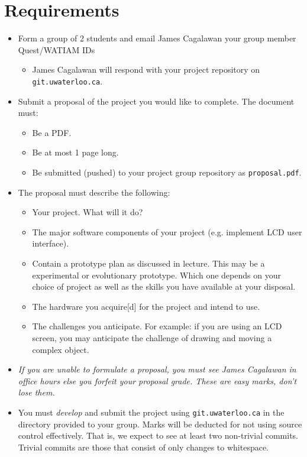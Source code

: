 \documentclass{article}
\begin{document}
\section*{Requirements}
\begin{itemize}
    \item{Form a group of 2 students and email James Cagalawan your group member Quest/WATIAM IDs}
        \begin{itemize}
            \item James Cagalawan will respond with your project repository on \texttt{git.uwaterloo.ca}.
        \end{itemize}\pagebreak[2]
    \item{Submit a proposal of the project you would like to complete.  The document must:}
        \begin{itemize}
            \item Be a PDF.
            \item Be at most 1 page long.
            \item Be submitted (pushed) to your project group repository as \texttt{proposal.pdf}.
        \end{itemize}\pagebreak[2]
    \item{The proposal must describe the following:}
        \begin{itemize}
            \item Your project.  What will it do?
            \item The major software components of your project (e.g. implement LCD user interface).
            \item Contain a prototype plan as discussed in lecture. This may be a experimental or evolutionary prototype. Which one depends on your choice of project as well as the skills you have available at your disposal.
            \item The hardware you acquire[d] for the project and intend to use.
            \item The challenges you anticipate.  For example: if you are using an LCD screen, you may anticipate the challenge of drawing and moving a complex object.
        \end{itemize}\pagebreak[2]
    \item \emph{If you are unable to formulate a proposal, you must see James Cagalawan in office hours else you forfeit your proposal grade. These are easy marks, don't lose them.}
    \item{You must \emph{develop} and submit the project using \texttt{git.uwaterloo.ca} in the directory provided to your group.  Marks will be deducted for not using source control effectively.  That is, we expect to see at least two non-trivial commits.  Trivial commits are those that consist of only changes to whitespace.}
\end{itemize}
\end{document}
